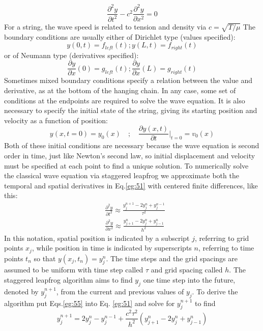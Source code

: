 \documentclass{book}
\theoremstyle{plain}
\theoremstyle{definition}
\numberwithin{exm}{chapter}
\theoremstyle{remark}
\theoremstyle{summary}
\theoremstyle{overview}
\begin{document}
\begin{equation}\label{eq:51}
	\frac{\partial^2 y}{\partial t^2} - c^2 \frac{\partial^2 y}{\partial x^2} = 0
\end{equation}
For a string, the wave speed is related to tension and density via $c = \sqrt{T / \mu} $ The
boundary conditions are usually either of Dirichlet type (values specified):
\begin{equation}\label{eq:52}
	y(0,t) = f_{left}(t) ; y(L,t) = f_{right}(t)
\end{equation}
or of Neumann type (derivatives specified):
\begin{equation}\label{eq:53}
	\frac{\partial y}{\partial x} (0)  = g_{left}(t) ; \frac{\partial y}{\partial x} (L)  = g_{right}(t)
\end{equation}
Sometimes mixed boundary conditions specify a relation between the value
and derivative, as at the bottom of the hanging chain. In any case, some set of
conditions at the endpoints are required to solve the wave equation. It is also
necessary to specify the initial state of the string, giving its starting position and
velocity as a function of position:
\begin{equation}\label{eq:54}
	y(x,t = 0) = y_0(x) \quad ; \quad \frac{\partial y(x,t)}{\partial t} \vert_{t=0} = v_0 (x)
\end{equation}
Both of these initial conditions are necessary because the wave equation is second
order in time, just like Newton\rq s second law, so initial displacement and velocity
must be specified at each point to find a unique solution.
To numerically solve the classical wave equation via staggered leapfrog we
approximate both the temporal and spatial derivatives in Eq.\eqref{eg:51} with centered
finite differences, like this:
\begin{equation}\label{eq:55}
\begin{aligned}
&\frac{\partial^{2} y}{\partial t^{2}} \approx \frac{y_{j}^{n+1}-2 y_{j}^{n}+y_{j}^{n-1}}{\tau^{2}} \\
&\frac{\partial^{2} y}{\partial x^{2}} \approx \frac{y_{j+1}^{n}-2 y_{j}^{n}+y_{j-1}^{n}}{h^{2}}
\end{aligned}
\end{equation}
In this notation, spatial position is indicated by a subscript $j$, referring to grid
points $x_j$, while position in time is indicated by superscripts $n$, referring to time
points $t_n$ so that $y(x_j,t_n) = y_j^n$. The time steps and the grid spacings are assumed to be uniform with time step called
$\tau$ and grid spacing called $h$. The staggered leapfrog algorithm aims to find $y_j$ one time step into the future, denoted by $y_j^{n+1}$,
from the current and previous values of $y_j$. To derive the algorithm put Eqs.\eqref{eg:55} into Eq. \eqref{eg:51} and solve for $y_j^{n+1}$ to find
\begin{equation}\label{eq:56}
	y_j^{n+1} = 2y_j^n - y_j^{n-1} + \frac{c^2 \tau^2}{h^2}(y_{j+1}^n - 2y^n_j + y^n_{j-1})
\end{equation}
\end{document}
